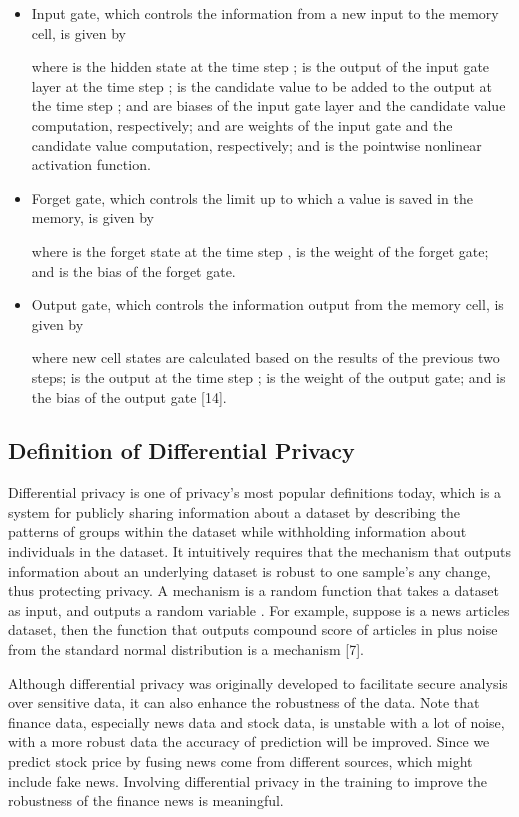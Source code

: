 \documentclass{article}
\begin{document}
\begin{itemize}

\item Input gate, which controls the information from a new input to the memory cell, is given by

where  is the hidden state at the time step ;  is the output of the input gate layer at the time step ;  is the candidate value to be added to the output at the time step ;  and  are biases of the input gate layer and the candidate value computation, respectively;  and  are weights of the input gate and the candidate value computation, respectively; and  is the pointwise nonlinear activation function.


\item Forget gate, which controls the limit up to which a value is saved in the memory, is given by

where  is the forget state at the time step ,  is the weight of the forget gate; and  is the bias of the forget gate.

\item Output gate, which controls the information output from the memory cell, is given by

where new cell states  are calculated based on the results of the previous two steps;  is the output at the time step ;  is the weight of the output gate; and  is the bias of the output gate [14].

\end{itemize}


\subsection{Definition of Differential Privacy}
Differential privacy is one of privacy's most popular definitions today, which is a system for publicly sharing information about a dataset by describing the patterns of groups within the dataset while withholding information about individuals in the dataset. It intuitively requires that the mechanism that outputs information about an underlying dataset is robust to one sample's any change, thus protecting privacy. A mechanism  is a random function that takes a dataset  as input, and outputs a random variable . For example, suppose  is a news articles dataset, then the function that outputs compound score of articles in  plus noise from the standard normal distribution is a mechanism [7].

Although differential privacy was originally developed to facilitate secure analysis over sensitive data, it can also enhance the robustness of the data. Note that finance data, especially news data and stock data, is unstable with a lot of noise, with a more robust data the accuracy of prediction will be improved. Since we predict stock price by fusing news come from different sources, which might include fake news. Involving differential privacy in the training to improve the robustness of the finance news is meaningful. 
\end{document}
